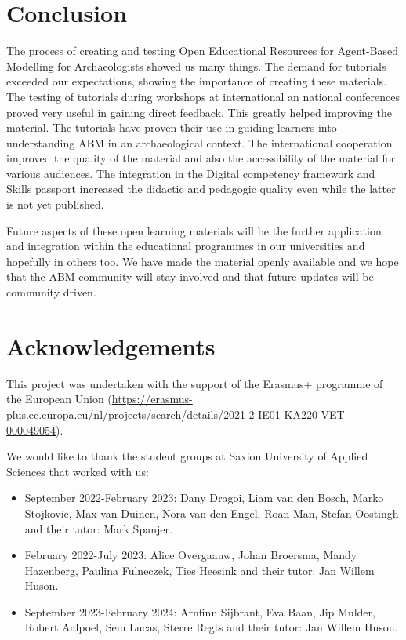 \documentclass[
]{article}
\begin{document}
\hypertarget{conclusion}{%
\section{Conclusion}\label{conclusion}}

The process of creating and testing Open Educational Resources for Agent-Based Modelling for Archaeologists showed us many things. The demand for tutorials exceeded our expectations, showing the importance of creating these materials. The testing of tutorials during workshops at international an national conferences proved very useful in gaining direct feedback. This greatly helped improving the material. The tutorials have proven their use in guiding learners into understanding ABM in an archaeological context. The international cooperation improved the quality of the material and also the accessibility of the material for various audiences. The integration in the Digital competency framework and Skills passport increased the didactic and pedagogic quality even while the latter is not yet published.

Future aspects of these open learning materials will be the further application and integration within the educational programmes in our universities and hopefully in others too. We have made the material openly available and we hope that the ABM-community will stay involved and that future updates will be community driven.

\hypertarget{acknowledgements}{%
\section{Acknowledgements}\label{acknowledgements}}

This project was undertaken with the support of the Erasmus+ programme of the European Union (\url{https://erasmus-plus.ec.europa.eu/nl/projects/search/details/2021-2-IE01-KA220-VET-000049054}).

We would like to thank the student groups at Saxion University of Applied Sciences that worked with us:

\begin{itemize}
\item
  September 2022-February 2023: Dany Dragoi, Liam van den Bosch, Marko Stojkovic, Max van Duinen, Nora van den Engel, Roan Man, Stefan Oostingh and their tutor: Mark Spanjer.
\item
  February 2022-July 2023: Alice Overgaauw, Johan Broersma, Mandy Hazenberg, Paulina Fulneczek, Ties Heesink and their tutor: Jan Willem Huson.
\item
  September 2023-February 2024: Arnfinn Sijbrant, Eva Baan, Jip Mulder, Robert Aalpoel, Sem Lucas, Sterre Regts and their tutor: Jan Willem Huson.
\end{itemize}
\end{document}
